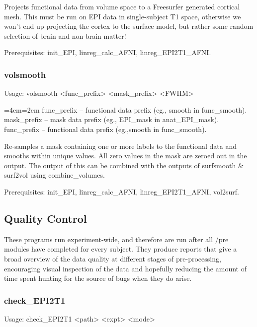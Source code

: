 \documentclass[final,titlepage,letterpaper,oneside,12pt]{article}
\renewcommand{\texttt}[2][BrickRed]{\textcolor{#1}{\ttfamily #2}}%
\newenvironment{blockquote}{%
  \par%
  \medskip
  \leftskip=4em\rightskip=2em%
  \noindent\ignorespaces}{%
  \par\medskip}
\begin{document}
\noindent Projects functional data from volume space to a Freesurfer generated cortical mesh. This must be run on EPI data in single-subject T1 space, otherwise we won't end up projecting the cortex to the surface model, but rather some random selection of brain and non-brain matter!

Prerequisites: \texttt{init\_EPI}, \texttt{linreg\_calc\_AFNI}, \texttt{linreg\_EPI2T1\_AFNI}.

\subsubsection{volsmooth}
Usage: \texttt{volsmooth <func\_prefix> <mask\_prefix> <FWHM>}

\begin{blockquote}
func\_prefix -- functional data prefix (eg., smooth in func\_smooth).
mask\_prefix -- mask data prefix (eg., EPI\_mask in anat\_EPI\_mask).
func\_prefix -- functional data prefix (eg.,smooth in func\_smooth).
\end{blockquote}

\noindent Re-samples a mask containing one or more labels to the functional data and smooths within unique values. All zero values in the mask are zeroed out in the output. The output of this can be combined with the outputs of \texttt{surfsmooth} \& \texttt{surf2vol} using \texttt{combine\_volumes}.

Prerequisites: \texttt{init\_EPI}, \texttt{linreg\_calc\_AFNI}, \texttt{linreg\_EPI2T1\_AFNI}, \texttt{vol2surf}.

\subsection{Quality Control}

These programs run experiment-wide, and therefore are run after all \texttt{/pre} modules have completed for every subject. They produce reports that give a broad overview of the data quality at different stages of pre-processing, encouraging visual inspection of the data and hopefully reducing the amount of time spent hunting for the source of bugs when they do arise.

\subsubsection{check\_EPI2T1}
Usage: \texttt{check\_EPI2T1 <path> <expt> <mode>}
\end{document}
